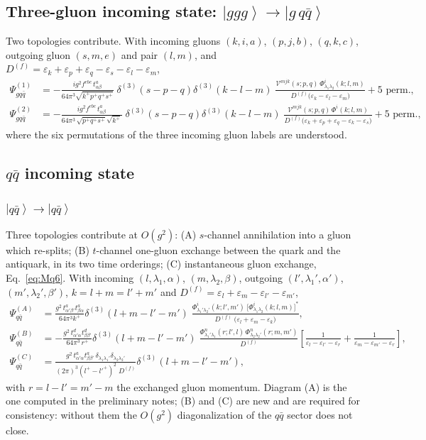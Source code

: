 \documentclass[11pt]{article}
\newcommand{\eps}{\varepsilon}
\newcommand{\ket}[1]{\left|#1\right\rangle}
\newcommand{\dthree}{\delta^{(3)}}
\newcommand{\Phiv}{\Phi}
\newcommand{\Vggg}{\mathcal{V}}
\begin{document}
\subsection{Three-gluon incoming state: $\ket{ggg}\to\ket{g\,q\bar q}$}
Two topologies contribute. With incoming gluons $(k,i,a)$, $(p,j,b)$, $(q,k,c)$, outgoing gluon
$(s,m,e)$ and pair $(l,m)$, and
$D^{(f)}=\eps_k+\eps_p+\eps_q-\eps_s-\eps_l-\eps_{m}$,
\begin{align}
\Psi^{(1)}_{gq\bar q}&=-\frac{ig^2f^{ebc}\,t^a_{\alpha\beta}}{64\pi^3\sqrt{k^+p^+q^+s^+}}\;
\dthree(s-p-q)\dthree(k-l-m)\;
\frac{\Vggg^{mjk}(s;p,q)\,\Phiv^i_{\lambda_1\lambda_2}(k;l,m)}
{D^{(f)}\big(\eps_k-\eps_l-\eps_{m}\big)}+\text{5 perm.},
\nonumber\\
\Psi^{(2)}_{gq\bar q}&=-\frac{ig^2f^{ebc}\,t^{a}_{\alpha\beta}}{64\pi^3\,\sqrt{p^+q^+s^+}\sqrt{k^+}}\;
\dthree(s-p-q)\dthree(k-l-m)\;
\frac{\Vggg^{mjk}(s;p,q)\,\Phiv^{i}(k;l,m)}
{D^{(f)}\big(\eps_k+\eps_p+\eps_q-\eps_k-\eps_{s}\big)}+\text{5 perm.},
\end{align}
where the six permutations of the three incoming gluon labels are understood.

\subsection{$q\bar q$ incoming state}

\subsubsection{$\ket{q\bar q}\to\ket{q\bar q}$}
Three topologies contribute at $O(g^2)$: (A) $s$-channel annihilation into a gluon which
re-splits; (B) $t$-channel one-gluon exchange between the quark and the antiquark, in its two time
orderings; (C) instantaneous gluon exchange, Eq.~\eqref{eq:Mq6}. With incoming $(l,\lambda_1,\alpha)$,
$(m,\lambda_2,\beta)$, outgoing $(l',\lambda_1',\alpha')$, $(m',\lambda_2',\beta')$,
$k=l+m=l'+m'$ and $D^{(f)}=\eps_l+\eps_m-\eps_{l'}-\eps_{m'}$,
\begin{align}
\Psi^{(A)}_{q\bar q}&=\frac{g^2\,t^a_{\alpha'\beta'}t^a_{\beta\alpha}}{64\pi^3 k^+}
\dthree(l+m-l'-m')\;
\frac{\Phiv^i_{\lambda_1'\lambda_2'}(k;l',m')\;
\big[\Phiv^i_{\lambda_1\lambda_2}(k;l,m)\big]^{*}}
{D^{(f)}\;\big(\eps_l+\eps_m-\eps_k\big)},
\label{eq:PsiA}\\
\Psi^{(B)}_{q\bar q}&=-\frac{g^2\,t^d_{\alpha'\alpha}t^d_{\beta\beta'}}{64\pi^3\,r^+}
\dthree(l+m-l'-m')\;
\frac{\Phiv^n_{\lambda_1'\lambda_1}(r;l',l)\,\Phiv^n_{\lambda_2\lambda_2'}(r;m,m')}{D^{(f)}}
\left[\frac{1}{\eps_l-\eps_{l'}-\eps_r}+\frac{1}{\eps_m-\eps_{m'}-\eps_r}\right],
\label{eq:PsiB}\\
\Psi^{(C)}_{q\bar q}&=\frac{g^2\,t^a_{\alpha'\alpha}t^a_{\beta\beta'}\,
\delta_{\lambda_1\lambda_1'}\delta_{\lambda_2\lambda_2'}}
{(2\pi)^3(l^+-l'^+)^2\;D^{(f)}}\dthree(l+m-l'-m'),
\label{eq:PsiC}
\end{align}
with $r=l-l'=m'-m$ the exchanged gluon momentum. Diagram (A) is the one computed in the
preliminary notes; (B) and (C) are new and are required for consistency: without them the
$O(g^2)$ diagonalization of the $q\bar q$ sector does not close.
\end{document}
